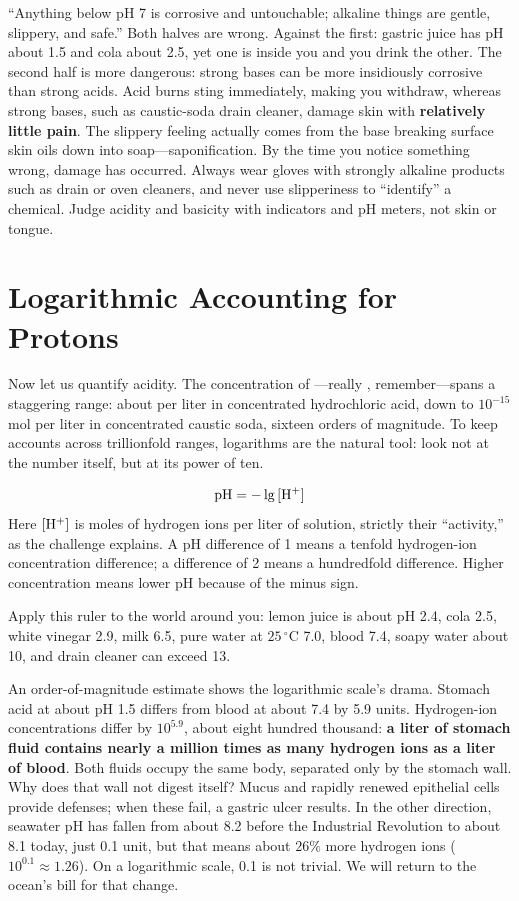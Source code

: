 \begin{wuqu}
``Anything below pH 7 is corrosive and untouchable; alkaline things are gentle, slippery, and safe.'' Both halves are wrong. Against the first: gastric juice has pH about 1.5 and cola about 2.5, yet one is inside you and you drink the other. The second half is more dangerous: strong bases can be more insidiously corrosive than strong acids. Acid burns sting immediately, making you withdraw, whereas strong bases, such as caustic-soda drain cleaner, damage skin with \textbf{relatively little pain}. The slippery feeling actually comes from the base breaking surface skin oils down into soap---saponification. By the time you notice something wrong, damage has occurred. Always wear gloves with strongly alkaline products such as drain or oven cleaners, and never use slipperiness to ``identify'' a chemical. Judge acidity and basicity with indicators and pH meters, not skin or tongue.
\end{wuqu}

\section{Logarithmic Accounting for Protons}

Now let us quantify acidity. The concentration of ---really , remember---spans a staggering range: about  per liter in concentrated hydrochloric acid, down to $10^{-15}$ mol per liter in concentrated caustic soda, sixteen orders of magnitude. To keep accounts across trillionfold ranges, logarithms are the natural tool: look not at the number itself, but at its power of ten.

\begin{qiaoliang}
\[\mathrm{pH} = -\lg\,[\mathrm{H^+}]\]
Here $[\mathrm{H^+}]$ is moles of hydrogen ions per liter of solution, strictly their ``activity,'' as the challenge explains. A pH difference of 1 means a tenfold hydrogen-ion concentration difference; a difference of 2 means a hundredfold difference. Higher concentration means lower pH because of the minus sign.
\end{qiaoliang}

Apply this ruler to the world around you: lemon juice is about pH 2.4, cola 2.5, white vinegar 2.9, milk 6.5, pure water at $25\,^{\circ}\mathrm{C}$ 7.0, blood 7.4, soapy water about 10, and drain cleaner can exceed 13.

An order-of-magnitude estimate shows the logarithmic scale's drama. Stomach acid at about pH 1.5 differs from blood at about 7.4 by 5.9 units. Hydrogen-ion concentrations differ by $10^{5.9}$, about eight hundred thousand: \textbf{a liter of stomach fluid contains nearly a million times as many hydrogen ions as a liter of blood}. Both fluids occupy the same body, separated only by the stomach wall. Why does that wall not digest itself? Mucus and rapidly renewed epithelial cells provide defenses; when these fail, a gastric ulcer results. In the other direction, seawater pH has fallen from about 8.2 before the Industrial Revolution to about 8.1 today, just 0.1 unit, but that means about $26\%$ more hydrogen ions ($10^{0.1}\approx1.26$). On a logarithmic scale, 0.1 is not trivial. We will return to the ocean's bill for that change.


